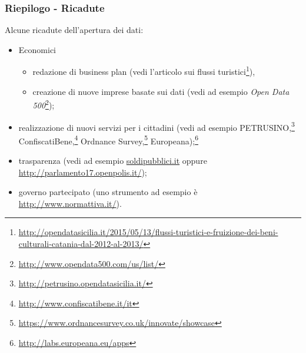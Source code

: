 \documentclass[8pt]{beamer}
\begin{document}
\begin{frame}
\frametitle{Riepilogo - Ricadute}
Alcune ricadute dell'apertura dei dati:
\vspace{\baselineskip}

\begin{itemize} [<+->]
 \item Economici
 \begin{itemize}
  \item redazione di business plan (vedi l'articolo sui flussi turistici\footnote{\url{http://opendatasicilia.it/2015/05/13/flussi-turistici-e-fruizione-dei-beni-culturali-catania-dal-2012-al-2013/}}),
  \item creazione di nuove imprese basate sui dati (vedi ad esempio \emph{Open Data 500}\footnote{\url{http://www.opendata500.com/us/list/}});
 \end{itemize}
 \item realizzazione di nuovi servizi per i cittadini (vedi ad esempio PETRUSINO,\footnote{\url{http://petrusino.opendatasicilia.it/}}
 ConfiscatiBene,\footnote{\url{http://www.confiscatibene.it/it}} Ordnance Survey,\footnote{\url{https://www.ordnancesurvey.co.uk/innovate/showcase}} Europeana);\footnote{\url{http://labs.europeana.eu/apps}}
 \item trasparenza (vedi ad esempio \url{soldipubblici.it} oppure \url{http://parlamento17.openpolis.it/});
 \item governo partecipato (uno strumento ad esempio è \url{http://www.normattiva.it/}).
\end{itemize}
\end{frame}
\end{document}

